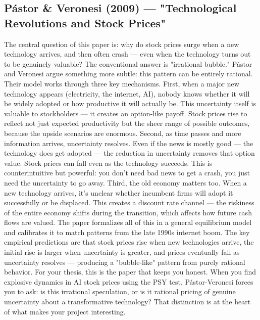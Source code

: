 

\subsection{Pástor & Veronesi (2009) — "Technological Revolutions and Stock Prices"}

The central question of this paper is: why do stock prices surge when a new technology arrives, and then often crash — even when the technology turns out to be genuinely valuable?
The conventional answer is "irrational bubble." Pástor and Veronesi argue something more subtle: this pattern can be entirely rational. Their model works through three key mechanisms.
First, when a major new technology appears (electricity, the internet, AI), nobody knows whether it will be widely adopted or how productive it will actually be. This uncertainty itself is valuable to stockholders — it creates an option-like payoff. Stock prices rise to reflect not just expected productivity but the sheer range of possible outcomes, because the upside scenarios are enormous.
Second, as time passes and more information arrives, uncertainty resolves. Even if the news is mostly good — the technology does get adopted — the reduction in uncertainty removes that option value. Stock prices can fall even as the technology succeeds. This is counterintuitive but powerful: you don't need bad news to get a crash, you just need the uncertainty to go away.
Third, the old economy matters too. When a new technology arrives, it's unclear whether incumbent firms will adopt it successfully or be displaced. This creates a discount rate channel — the riskiness of the entire economy shifts during the transition, which affects how future cash flows are valued.
The paper formalizes all of this in a general equilibrium model and calibrates it to match patterns from the late 1990s internet boom. The key empirical predictions are that stock prices rise when new technologies arrive, the initial rise is larger when uncertainty is greater, and prices eventually fall as uncertainty resolves — producing a "bubble-like" pattern from purely rational behavior.
For your thesis, this is the paper that keeps you honest. When you find explosive dynamics in AI stock prices using the PSY test, Pástor-Veronesi forces you to ask: is this irrational speculation, or is it rational pricing of genuine uncertainty about a transformative technology? That distinction is at the heart of what makes your project interesting.


